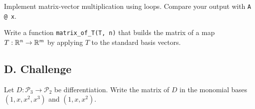 \begin{exercise}
Implement matrix-vector multiplication using loops. Compare your output with
\texttt{A @ x}.
\end{exercise}

\begin{exercise}
Write a function \texttt{matrix\_of\_T(T, n)} that builds the matrix of a map
$T:\mathbb{R}^n\to\mathbb{R}^m$ by applying $T$ to the standard basis vectors.
\end{exercise}

\subsection*{D. Challenge}

\begin{exercise}
Let $D:\mathcal P_3\to\mathcal P_2$ be differentiation. Write the matrix of
$D$ in the monomial bases $(1,x,x^2,x^3)$ and $(1,x,x^2)$.
\end{exercise}
